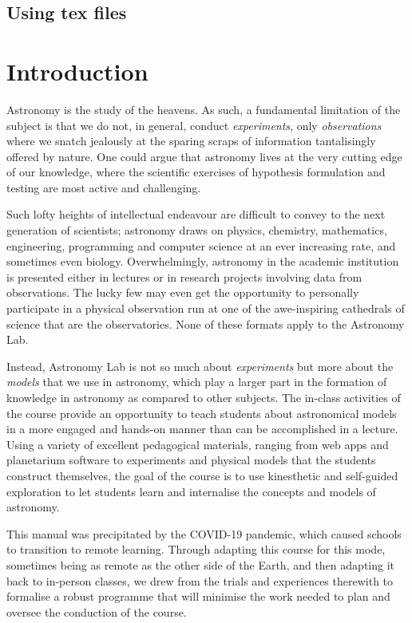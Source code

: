 \documentclass[12pt]{article}
\begin{document}
\subsection{Using tex files}


\section{Introduction}
Astronomy is the study of the heavens. As such, a fundamental limitation of the subject is that we do not, in general, conduct \emph{experiments}, only \emph{observations} where we snatch jealously at the sparing scraps of information tantalisingly offered by nature. One could argue that astronomy lives at the very cutting edge of our knowledge, where the scientific exercises of hypothesis formulation and testing are most active and challenging.

Such lofty heights of intellectual endeavour are difficult to convey to the next generation of scientists; astronomy draws on physics, chemistry, mathematics, engineering, programming and computer science at an ever increasing rate, and sometimes even biology. Overwhelmingly, astronomy in the academic institution is presented either in lectures or in research projects involving data from observations. The lucky few may even get the opportunity to personally participate in a physical observation run at one of the awe-inspiring cathedrals of science that are the observatories. None of these formats apply to the Astronomy Lab.

Instead, Astronomy Lab is not so much about \emph{experiments} but more about the \emph{models} that we use in astronomy, which play a larger part in the formation of knowledge in astronomy as compared to other subjects. The in-class activities of the course provide an opportunity to teach students about astronomical models in a more engaged and hands-on manner than can be accomplished in a lecture. Using a variety of excellent pedagogical materials, ranging from web apps and planetarium software to experiments and physical models that the students construct themselves, the goal of the course is to use kinesthetic and self-guided exploration to let students learn and internalise the concepts and models of astronomy.

This manual was precipitated by the COVID-19 pandemic, which caused schools to transition to remote learning. Through adapting this course for this mode, sometimes being as remote as the other side of the Earth, and then adapting it back to in-person classes, we drew from the trials and experiences therewith to formalise a robust programme that will minimise the work needed to plan and oversee the conduction of the course.
\end{document}
